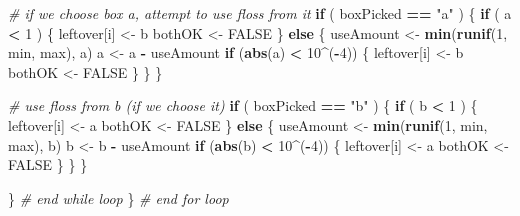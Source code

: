 \documentclass[]{book}
\makeatletter
\newenvironment{Shaded}{\begin{snugshade}}{\end{snugshade}}
\newcommand{\KeywordTok}[1]{\textcolor[rgb]{0.13,0.29,0.53}{\textbf{#1}}}
\newcommand{\DecValTok}[1]{\textcolor[rgb]{0.00,0.00,0.81}{#1}}
\newcommand{\StringTok}[1]{\textcolor[rgb]{0.31,0.60,0.02}{#1}}
\newcommand{\CommentTok}[1]{\textcolor[rgb]{0.56,0.35,0.01}{\textit{#1}}}
\newcommand{\OtherTok}[1]{\textcolor[rgb]{0.56,0.35,0.01}{#1}}
\newcommand{\ControlFlowTok}[1]{\textcolor[rgb]{0.13,0.29,0.53}{\textbf{#1}}}
\newcommand{\OperatorTok}[1]{\textcolor[rgb]{0.81,0.36,0.00}{\textbf{#1}}}
\newcommand{\NormalTok}[1]{#1}
\newenvironment{kframe}{%
\medskip{}
\setlength{\fboxsep}{.8em}
 \def\at@end@of@kframe{}%
 \ifinner\ifhmode%
  \def\at@end@of@kframe{\end{minipage}}%
  \begin{minipage}{\columnwidth}%
 \fi\fi%
 \def\FrameCommand##1{\hskip\@totalleftmargin \hskip-\fboxsep
 \colorbox{shadecolor}{##1}\hskip-\fboxsep
     \hskip-\linewidth \hskip-\@totalleftmargin \hskip\columnwidth}%
 \MakeFramed {\advance\hsize-\width
   \@totalleftmargin\z@ \linewidth\hsize
   \@setminipage}}%
 {\par\unskip\endMakeFramed%
 \at@end@of@kframe}
\renewenvironment{Shaded}{\begin{kframe}}{\end{kframe}}
\theoremstyle{definition}
\theoremstyle{definition}
\theoremstyle{definition}
\theoremstyle{remark}
\makeatother
\begin{document}
{\begin{Shaded}
\begin{Highlighting}[]
      \CommentTok{# if we choose box a, attempt to use floss from it}
      \ControlFlowTok{if}\NormalTok{ ( boxPicked }\OperatorTok{==}\StringTok{ "a"}\NormalTok{ ) \{}
        \ControlFlowTok{if}\NormalTok{ ( a }\OperatorTok{<}\StringTok{ }\DecValTok{1}\NormalTok{ ) \{}
\NormalTok{          leftover[i] <-}\StringTok{ }\NormalTok{b}
\NormalTok{          bothOK <-}\StringTok{ }\OtherTok{FALSE}
\NormalTok{        \} }\ControlFlowTok{else}\NormalTok{ \{}
\NormalTok{          useAmount <-}\StringTok{ }\KeywordTok{min}\NormalTok{(}\KeywordTok{runif}\NormalTok{(}\DecValTok{1}\NormalTok{, min, max), a)}
\NormalTok{          a <-}\StringTok{ }\NormalTok{a }\OperatorTok{-}\StringTok{ }\NormalTok{useAmount}
          \ControlFlowTok{if}\NormalTok{ (}\KeywordTok{abs}\NormalTok{(a) }\OperatorTok{<}\StringTok{ }\DecValTok{10}\OperatorTok{^}\NormalTok{(}\OperatorTok{-}\DecValTok{4}\NormalTok{)) \{}
\NormalTok{            leftover[i] <-}\StringTok{ }\NormalTok{b}
\NormalTok{            bothOK <-}\StringTok{ }\OtherTok{FALSE}
\NormalTok{          \}}
\NormalTok{        \}}
\NormalTok{      \}}
      
      \CommentTok{# use floss from b (if we choose it) }
      \ControlFlowTok{if}\NormalTok{ ( boxPicked }\OperatorTok{==}\StringTok{ "b"}\NormalTok{ ) \{}
        \ControlFlowTok{if}\NormalTok{ ( b }\OperatorTok{<}\StringTok{ }\DecValTok{1}\NormalTok{ ) \{}
\NormalTok{          leftover[i] <-}\StringTok{ }\NormalTok{a}
\NormalTok{          bothOK <-}\StringTok{ }\OtherTok{FALSE}
\NormalTok{        \} }\ControlFlowTok{else}\NormalTok{ \{}
\NormalTok{          useAmount <-}\StringTok{ }\KeywordTok{min}\NormalTok{(}\KeywordTok{runif}\NormalTok{(}\DecValTok{1}\NormalTok{, min, max), b)}
\NormalTok{          b <-}\StringTok{ }\NormalTok{b }\OperatorTok{-}\StringTok{ }\NormalTok{useAmount}
          \ControlFlowTok{if}\NormalTok{ (}\KeywordTok{abs}\NormalTok{(b) }\OperatorTok{<}\StringTok{ }\DecValTok{10}\OperatorTok{^}\NormalTok{(}\OperatorTok{-}\DecValTok{4}\NormalTok{)) \{}
\NormalTok{            leftover[i] <-}\StringTok{ }\NormalTok{a}
\NormalTok{            bothOK <-}\StringTok{ }\OtherTok{FALSE}
\NormalTok{          \}}
\NormalTok{        \}}
\NormalTok{      \}}
        
\NormalTok{    \}  }\CommentTok{# end while  loop}
\NormalTok{  \}    }\CommentTok{# end for loop}
  

\end{Highlighting}
\end{Shaded}}
\end{document}
